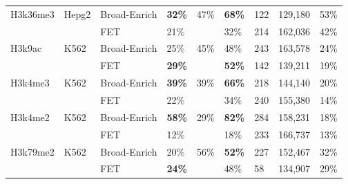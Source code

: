 \begin{sidewaystable}[!ht]
\begin{tabular}{lll|p{1.5cm}p{1.5cm}p{1.5cm}p{1.5cm}p{1.5cm}p{1.5cm}}
H3k36me3     & Hepg2              & Broad-Enrich    & \textbf{32\%}                 & 47\%                          & \textbf{68\%}                    & 122                      & 129,180                & 53\%                     \\
             &                    & FET             & 21\%                          &                               & 32\%                             & 214                      & 162,036                & 42\%                     \\
H3k9ac       & K562               & Broad-Enrich    & 25\%                          & 45\%                          & 48\%                             & 243                      & 163,578                & 24\%                     \\
             &                    & FET             & \textbf{29\%}                 &                               & \textbf{52\%}                    & 142                      & 139,211                & 19\%                     \\
H3k4me3      & K562               & Broad-Enrich    & \textbf{39\%}                 & 39\%                          & \textbf{66\%}                    & 218                      & 144,140                & 20\%                     \\
             &                    & FET             & 22\%                          &                               & 34\%                             & 240                      & 155,380                & 14\%                     \\
H3k4me2      & K562               & Broad-Enrich    & \textbf{58\%}                 & 29\%                          & \textbf{82\%}                    & 284                      & 158,231                & 18\%                     \\
             &                    & FET             & 12\%                          &                               & 18\%                             & 233                      & 166,737                & 13\%                     \\
H3k79me2     & K562               & Broad-Enrich    & 20\%                          & 56\%                          & \textbf{52\%}                    & 227                      & 152,467                & 32\%                     \\
             &                    & FET             & \textbf{24\%}                 &                               & 48\%                             & 58                       & 134,907                & 29\%                     \\

\end{tabular}
\end{sidewaystable}
